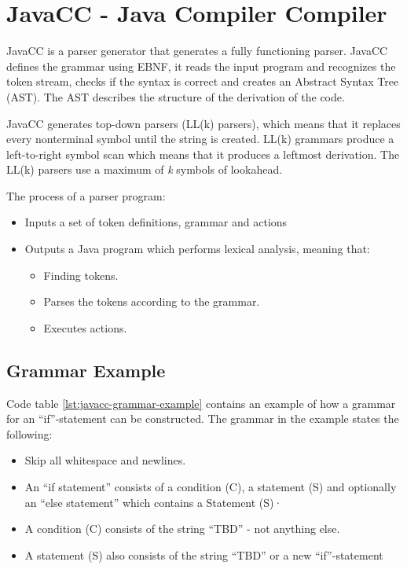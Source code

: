 \chapter{JavaCC - Java Compiler Compiler}
JavaCC is a parser generator that generates a fully functioning parser. JavaCC defines the grammar using EBNF, it reads the input program and recognizes the token stream, checks if the syntax is correct and creates an Abstract Syntax Tree (AST). The AST describes the structure of the derivation of the code. \cite{JavaCC}

JavaCC generates top-down parsers (LL(k) parsers), which means that it replaces every nonterminal symbol until the string is created. LL(k) grammars produce a left-to-right symbol scan which means that it produces a leftmost derivation. The LL(k) parsers use a maximum of \textit{k} symbols of lookahead.

The process of a parser program:
\begin{itemize}
\item Inputs a set of token definitions, grammar and actions
\item Outputs a Java program which performs lexical analysis, meaning that:
	\begin{itemize}
	\item Finding tokens.
	\item Parses the tokens according to the grammar.
	\item Executes actions.
	\end{itemize}
\end{itemize}


\section{Grammar Example}
Code table \ref{lst:javacc-grammar-example} contains an example of how a grammar for an ``if''-statement can be constructed. The grammar in the example states the following:

\begin{itemize}
	\item Skip all whitespace and newlines.
	\item An ``if statement'' consists of a condition (C), a statement (S)  and optionally an ``else statement'' which contains a Statement (S)·
	\item A condition (C) consists of the string ``TBD'' - not anything else.
	\item A statement (S) also consists of the string ``TBD'' or a new ``if''-statement
\end{itemize}

